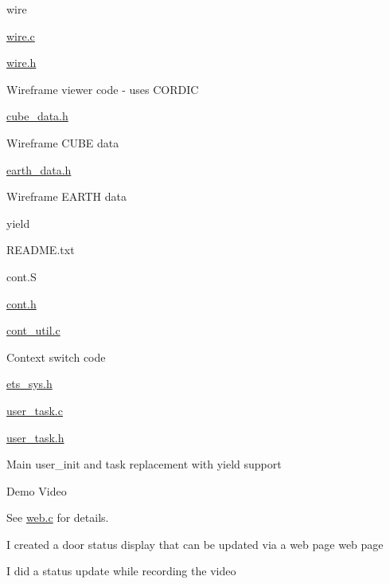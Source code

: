 wire
\begin{DoxyItemize}
\item \hyperlink{wire_8c}{wire.\+c}
\item \hyperlink{wire_8h}{wire.\+h}
\begin{DoxyItemize}
\item Wireframe viewer code -\/ uses C\+O\+R\+D\+IC
\end{DoxyItemize}
\item \hyperlink{cube__data_8h}{cube\+\_\+data.\+h}
\begin{DoxyItemize}
\item Wireframe C\+U\+BE data
\end{DoxyItemize}
\item \hyperlink{earth__data_8h}{earth\+\_\+data.\+h}
\begin{DoxyItemize}
\item Wireframe E\+A\+R\+TH data
\end{DoxyItemize}
\end{DoxyItemize}

yield
\begin{DoxyItemize}
\item R\+E\+A\+D\+M\+E.\+txt
\item cont.\+S
\item \hyperlink{cont_8h}{cont.\+h}
\item \hyperlink{cont__util_8c}{cont\+\_\+util.\+c}
\begin{DoxyItemize}
\item Context switch code
\end{DoxyItemize}
\item \hyperlink{ets__sys_8h}{ets\+\_\+sys.\+h}
\item \hyperlink{user__task_8c}{user\+\_\+task.\+c}
\item \hyperlink{user__task_8h}{user\+\_\+task.\+h}
\begin{DoxyItemize}
\item Main user\+\_\+init and task replacement with yield support
\end{DoxyItemize}
\end{DoxyItemize}

\begin{DoxyParagraph}{Demo Video}

\begin{DoxyItemize}
\item See \hyperlink{web_8c}{web.\+c} for details.
\begin{DoxyItemize}
\item I created a door status display that can be updated via a web page web page
\item I did a status update while recording the video
\end{DoxyItemize}
\end{DoxyItemize}
\end{DoxyParagraph}

